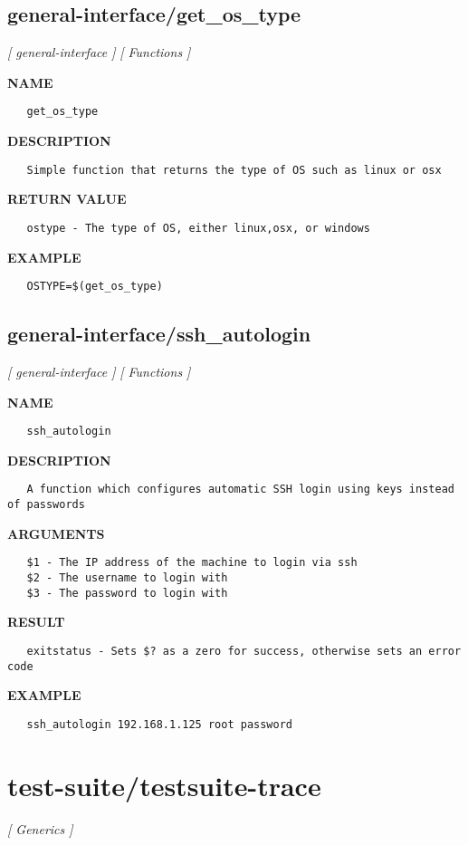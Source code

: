 \subsection{general-interface/get\_os\_type}
\textsl{[ general-interface ]}
\textsl{[ Functions ]}

\label{ch:robo30}
\label{ch:general_interface_get_os_type}
\textbf{NAME}
\begin{verbatim}
   get_os_type
\end{verbatim}
\textbf{DESCRIPTION}
\begin{verbatim}
   Simple function that returns the type of OS such as linux or osx
\end{verbatim}
\textbf{RETURN VALUE}
\begin{verbatim}
   ostype - The type of OS, either linux,osx, or windows
\end{verbatim}
\textbf{EXAMPLE}
\begin{verbatim}
   OSTYPE=$(get_os_type)
\end{verbatim}
\newpage
\subsection{general-interface/ssh\_autologin}
\textsl{[ general-interface ]}
\textsl{[ Functions ]}

\label{ch:robo31}
\label{ch:general_interface_ssh_autologin}
\textbf{NAME}
\begin{verbatim}
   ssh_autologin
\end{verbatim}
\textbf{DESCRIPTION}
\begin{verbatim}
   A function which configures automatic SSH login using keys instead of passwords
\end{verbatim}
\textbf{ARGUMENTS}
\begin{verbatim}
   $1 - The IP address of the machine to login via ssh
   $2 - The username to login with
   $3 - The password to login with
\end{verbatim}
\textbf{RESULT}
\begin{verbatim}
   exitstatus - Sets $? as a zero for success, otherwise sets an error code
\end{verbatim}
\textbf{EXAMPLE}
\begin{verbatim}
   ssh_autologin 192.168.1.125 root password
\end{verbatim}
\newpage
\section{test-suite/testsuite-trace}
\textsl{[ Generics ]}

